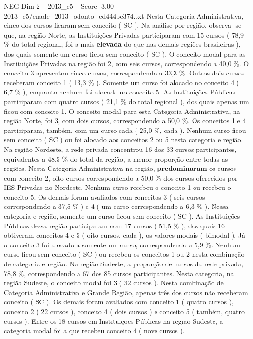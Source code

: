 \begin{textsample}{NEG Dim 2 – 2013\_c5 – Score -3.00 – 2013\_c5/enade\_2013\_odonto\_ed444be374.txt}
Nesta Categoria Administrativa, cinco dos cursos ficaram sem conceito ( SC ).
Na análise por região, observa -se que, na região Norte, as Instituições Privadas participaram com 15 cursos ( 78,9 \% do total regional, foi a mais \textbf{elevada} do que nas demais regiões brasileiras ), dos quais somente um curso ficou sem conceito ( SC ).
O conceito modal para as Instituições Privadas na região foi 2, com seis cursos, correspondendo a 40,0 \%.
O conceito 3 apresentou cinco cursos, correspondendo a 33,3 \%.
Outros dois cursos receberam conceito 1 ( 13,3 \% ).
Somente um curso foi alocado no conceito 4 ( 6,7 \% ), enquanto nenhum foi alocado no conceito 5.
As Instituições Públicas participaram com quatro cursos ( 21,1 \% do total regional ), dos quais apenas um ficou com conceito 1.
O conceito modal para esta Categoria Administrativa, na região Norte, foi 3, com dois cursos, correspondendo a 50,0 \%.
Os conceitos 1 e 4 participaram, também, com um curso cada ( 25,0 \%, cada ).
Nenhum curso ficou sem conceito ( SC ) ou foi alocado aos conceitos 2 ou 5 nesta categoria e região.
Na região Nordeste, a rede privada concentrou 16 dos 33 cursos participantes, equivalentes a 48,5 \% do total da região, a menor proporção entre todas as regiões.
Nesta Categoria Administrativa na região, \textbf{predominaram} os cursos com conceito 2, oito cursos correspondendo a 50,0 \% dos cursos oferecidos por IES Privadas no Nordeste.
Nenhum curso recebeu o conceito 1 ou recebeu o conceito 5.
Os demais foram avaliados com conceitos 3 ( seis cursos correspondendo a 37,5 \% ) e 4 ( um curso correspondendo a 6,3 \% ).
Nessa categoria e região, somente um curso ficou sem conceito ( SC ).
As Instituições Públicas dessa região participaram com 17 cursos ( 51,5 \% ), dos quais 16 obtiveram conceitos 4 e 5 ( oito cursos, cada ), os valores modais ( bimodal ).
Já o conceito 3 foi alocado a somente um curso, correspondendo a 5,9 \%.
Nenhum curso ficou sem conceito ( SC ) ou recebeu os conceitos 1 ou 2 nesta combinação de categoria e região.
Na região Sudeste, a proporção de cursos da rede privada, 78,8 \%, correspondendo a 67 dos 85 cursos participantes.
Nesta categoria, na região Sudeste, o conceito modal foi 3 ( 32 cursos ).
Nesta combinação de Categoria Administrativa e Grande Região, apenas três dos cursos não receberam conceito ( SC ).
Os demais foram avaliados com conceito 1 ( quatro cursos ), conceito 2 ( 22 cursos ), conceito 4 ( dois cursos ) e conceito 5 ( também, quatro cursos ).
Entre os 18 cursos em Instituições Públicas na região Sudeste, a categoria modal foi a que recebeu conceito 4 ( nove cursos ).

\end{textsample}

